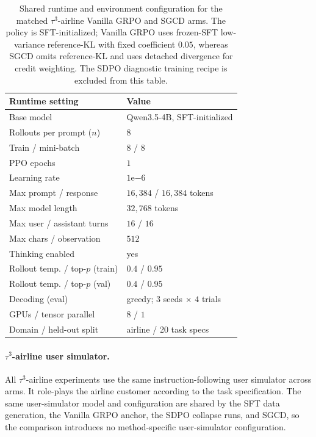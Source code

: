 \begin{table}[h]
  \centering
  \venuecompacttablefont
  \setlength{\tabcolsep}{3pt}
  \begin{tabular}{p{}p{}}
    \hline
    \textbf{Runtime setting} & \textbf{Value} \\
    \hline
    Base model                  & Qwen3.5-4B, SFT-initialized \\
    Rollouts per prompt ($n$)   & $8$ \\
    Train / mini-batch          & $8$ / $8$ \\
    PPO epochs                  & $1$ \\
    Learning rate               & $1\mathrm{e}{-6}$ \\
    Max prompt / response       & $16{,}384$ / $16{,}384$ tokens \\
    Max model length            & $32{,}768$ tokens \\
    Max user / assistant turns  & $16$ / $16$ \\
    Max chars / observation     & $512$ \\
    Thinking enabled            & yes \\
    Rollout temp. / top-$p$ (train) & $0.4$ / $0.95$ \\
    Rollout temp. / top-$p$ (val)   & $0.4$ / $0.95$ \\
    Decoding (eval)             & greedy; $3$ seeds $\times$ $4$ trials \\
    GPUs / tensor parallel      & $8$ / $1$ \\
    Domain / held-out split     & airline / 20 task specs \\
    \hline
  \end{tabular}
  \caption{Shared runtime and environment configuration for the matched
    $\tau^3$-airline Vanilla GRPO and SGCD arms. The policy is SFT-initialized;
    Vanilla GRPO uses frozen-SFT low-variance reference-KL with fixed coefficient
    $0.05$, whereas SGCD omits reference-KL and uses detached divergence for
    credit weighting. The SDPO diagnostic training recipe is excluded from this
    table.}
  \label{tab:recipe_tau3}
\end{table}

\paragraph{$\tau^3$-airline user simulator.} All $\tau^3$-airline experiments
use the same instruction-following user simulator across arms. It role-plays the
airline customer according to the task specification. The same user-simulator
model and configuration are shared by the
SFT data generation, the Vanilla GRPO anchor, the SDPO collapse runs, and SGCD, so
the comparison introduces no method-specific user-simulator configuration.

